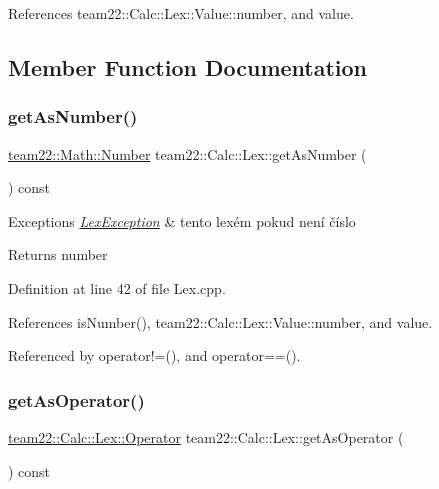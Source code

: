 References team22\+::\+Calc\+::\+Lex\+::\+Value\+::number, and value.



\subsection{Member Function Documentation}
\mbox{\label{classteam22_1_1_calc_1_1_lex_a794e75373451a906a2cfc60e5d6b1996}} 
\subsubsection{\texorpdfstring{get\+As\+Number()}{getAsNumber()}}
{\footnotesize\ttfamily \hyperlink{classteam22_1_1_math_1_1_number}{team22\+::\+Math\+::\+Number} team22\+::\+Calc\+::\+Lex\+::get\+As\+Number (\begin{DoxyParamCaption}{ }\end{DoxyParamCaption}) const}


\begin{DoxyExceptions}{Exceptions}
{\em \hyperlink{classteam22_1_1_calc_1_1_lex_exception}{Lex\+Exception}} & tento lexém pokud není číslo \\
\hline
\end{DoxyExceptions}
\begin{DoxyReturn}{Returns}
number 
\end{DoxyReturn}


Definition at line 42 of file Lex.\+cpp.



References is\+Number(), team22\+::\+Calc\+::\+Lex\+::\+Value\+::number, and value.



Referenced by operator!=(), and operator==().

\mbox{\label{classteam22_1_1_calc_1_1_lex_afdeee7e9b13fcb9826d4d8fd7d5f141f}} 
\subsubsection{\texorpdfstring{get\+As\+Operator()}{getAsOperator()}}
{\footnotesize\ttfamily \hyperlink{classteam22_1_1_calc_1_1_lex_a61d29fc4878a3b36d2de2f13c56ed932}{team22\+::\+Calc\+::\+Lex\+::\+Operator} team22\+::\+Calc\+::\+Lex\+::get\+As\+Operator (\begin{DoxyParamCaption}{ }\end{DoxyParamCaption}) const}


